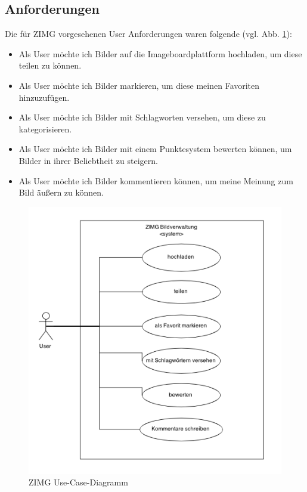 \documentclass[12pt, oneside, a4paper]{article}		%
\begin{document}
\subsection{Anforderungen}

Die für ZIMG vorgesehenen User Anforderungen waren folgende (vgl. Abb. \ref{ZIMGUseCaseDiagram}):

\begin{itemize}
	\item Als User möchte ich Bilder auf die Imageboardplattform hochladen, um diese teilen zu können.
	\item Als User möchte ich Bilder markieren, um diese meinen Favoriten hinzuzufügen.
	\item Als User möchte ich Bilder mit Schlagworten versehen, um diese zu kategorisieren.
	\item Als User möchte ich Bilder mit einem Punktesystem bewerten können, um Bilder in ihrer Beliebtheit zu steigern.
	\item Als User möchte ich Bilder kommentieren können, um meine Meinung zum Bild äußern zu können.
\end{itemize}

\begin{figure}[H]
 	\centering
 	\includegraphics[width=\linewidth]{footage/ZIMG_UseCaseDiagram} 
 	\caption{ZIMG Use-Case-Diagramm}
	\label{ZIMGUseCaseDiagram}
 \end{figure}
\end{document}
